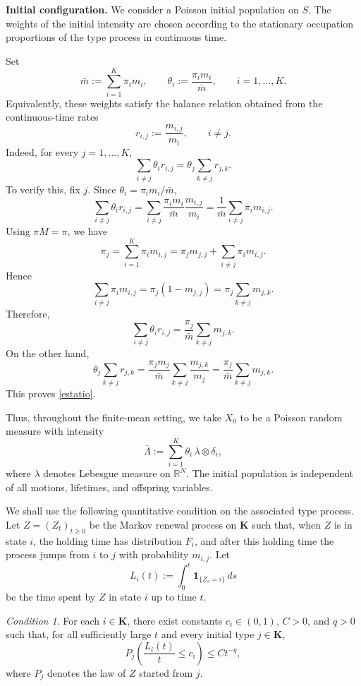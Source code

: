 \documentclass[reqno,final,11pt]{amsart}
\newcommand{\1}{\mathbbm{1}}
\theoremstyle{plain}
\theoremstyle{definition}
\theoremstyle{remark}
\newtheorem{condition}{Condition}[section]
\begin{document}
\medskip

\noindent\textbf{Initial configuration.}
We consider a Poisson initial population on \(S\). The weights of the initial intensity are chosen
according to the stationary occupation proportions of the type process in continuous time.

Set
\[
\bar m:=\sum_{i=1}^K\pi_i m_i,
\qquad
\theta_i:=\frac{\pi_i m_i}{\bar m},
\qquad i=1,\dots,K.
\]
Equivalently, these weights satisfy the balance relation obtained from the continuous-time rates
\[
r_{i,j}:=\frac{m_{i,j}}{m_i},
\qquad i\ne j.
\]
Indeed, for every \(j=1,\dots,K\),
\begin{equation*}
\sum_{i\ne j}\theta_i r_{i,j}
=
\theta_j\sum_{k\ne j}r_{j,k}.
\end{equation*}
To verify this, fix \(j\). Since \(\theta_i=\pi_i m_i/\bar m\),
\[
\sum_{i\ne j}\theta_i r_{i,j}
=
\sum_{i\ne j}
\frac{\pi_i m_i}{\bar m}
\frac{m_{i,j}}{m_i}
=
\frac1{\bar m}
\sum_{i\ne j}\pi_i m_{i,j}.
\]
Using \(\pi M=\pi\), we have
\[
\pi_j
=
\sum_{i=1}^K\pi_i m_{i,j}
=
\pi_jm_{j,j}
+
\sum_{i\ne j}\pi_i m_{i,j}.
\]
Hence
\[
\sum_{i\ne j}\pi_i m_{i,j}
=
\pi_j(1-m_{j,j})
=
\pi_j\sum_{k\ne j}m_{j,k}.
\]
Therefore,
\[
\sum_{i\ne j}\theta_i r_{i,j}
=
\frac{\pi_j}{\bar m}\sum_{k\ne j}m_{j,k}.
\]
On the other hand,
\[
\theta_j\sum_{k\ne j}r_{j,k}
=
\frac{\pi_jm_j}{\bar m}
\sum_{k\ne j}\frac{m_{j,k}}{m_j}
=
\frac{\pi_j}{\bar m}\sum_{k\ne j}m_{j,k}.
\]
This proves \eqref{estatio}.

Thus, throughout the finite-mean setting, we take \(X_0\) to be a Poisson random
measure with intensity
\[
\bar\Lambda
:=
\sum_{i=1}^K\theta_i\,\lambda\otimes\delta_i,
\]
where \(\lambda\) denotes Lebesgue measure on \(\mathbb R^N\). The initial population is
independent of all motions, lifetimes, and offspring variables.

\medskip



We shall use the following quantitative condition on the associated type process. Let
\(Z=(Z_t)_{t\ge0}\) be the Markov renewal process on \(\mathbf K\) such that, when \(Z\) is in
state \(i\), the holding time has distribution \(F_i\), and after this holding time the process jumps
from \(i\) to \(j\) with probability \(m_{i,j}\). Let
\[
L_i(t):=\int_0^t\mathbf 1_{\{Z_s=i\}}\,ds
\]
be the time spent by \(Z\) in state \(i\) up to time \(t\).

\begin{condition}\label{Ac}
For each \(i\in\mathbf K\), there exist constants \(c_i\in(0,1)\), \(C>0\), and \(q>0\) such that,
for all sufficiently large \(t\) and every initial type \(j\in\mathbf K\),
\begin{equation}\label{eq:occupation-condition}
P_j\left(\frac{L_i(t)}{t}\le c_i\right)
\le
C t^{-q},
\end{equation}
where \(P_j\) denotes the law of \(Z\) started from \(j\).
\end{condition}
\end{document}
